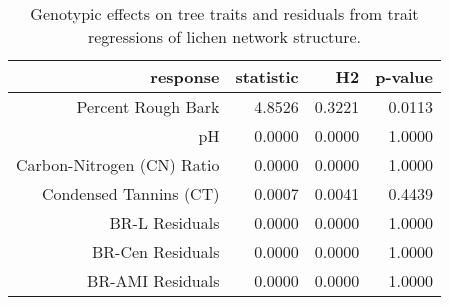 \begin{table}[ht]
\centering
\begin{tabular}{rrrr}
  \hline
response & statistic & H2 & p-value \\ 
  \hline
Percent Rough Bark & 4.8526 & 0.3221 & 0.0113 \\ 
  pH & 0.0000 & 0.0000 & 1.0000 \\ 
  Carbon-Nitrogen (CN) Ratio & 0.0000 & 0.0000 & 1.0000 \\ 
  Condensed Tannins (CT) & 0.0007 & 0.0041 & 0.4439 \\ 
  BR-L Residuals & 0.0000 & 0.0000 & 1.0000 \\ 
  BR-Cen Residuals & 0.0000 & 0.0000 & 1.0000 \\ 
  BR-AMI Residuals & 0.0000 & 0.0000 & 1.0000 \\ 
   \hline
\end{tabular}
\caption{Genotypic effects on tree traits and residuals from trait regressions of lichen network structure.} 
\label{tab:h2_trait}
\end{table}

